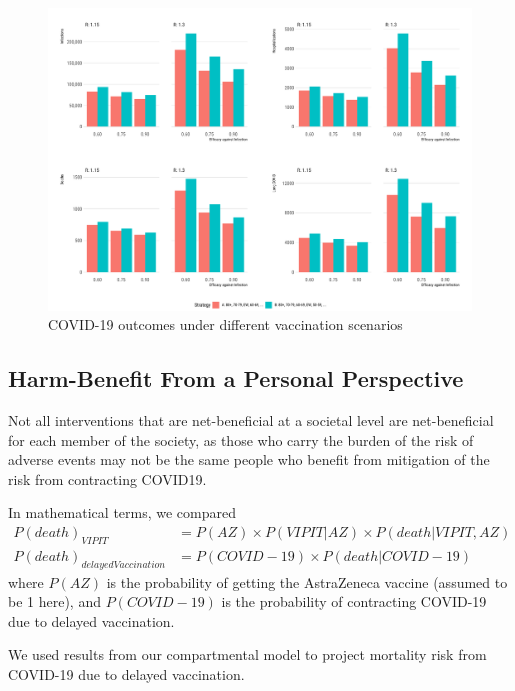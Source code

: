 \documentclass[]{interact}
\theoremstyle{plain}%
\theoremstyle{definition}
\theoremstyle{remark}
\begin{document}
\begin{figure}

{\centering \includegraphics[width=1\linewidth]{../figures/fig-barplots} 

}

\caption{COVID-19 outcomes under different vaccination scenarios}\label{fig:fig2}
\end{figure}

\hypertarget{harm-benefit-from-a-personal-perspective}{%
\subsection{Harm-Benefit From a Personal
Perspective}\label{harm-benefit-from-a-personal-perspective}}

Not all interventions that are net-beneficial at a societal level are
net-beneficial for each member of the society, as those who carry the
burden of the risk of adverse events may not be the same people who
benefit from mitigation of the risk from contracting COVID19.

In mathematical terms, we compared \[
\begin{aligned}
P(death)_{VIPIT}  &= P(AZ) \times P(VIPIT|AZ) \times P(death|VIPIT, AZ) \\
P(death)_{delayedVaccination} &= P(COVID-19) \times P(death|COVID-19)
\end{aligned}
\] where \(P(AZ)\) is the probability of getting the AstraZeneca vaccine
(assumed to be 1 here), and \(P(COVID-19)\) is the probability of
contracting COVID-19 due to delayed vaccination.

We used results from our compartmental model to project mortality risk
from COVID-19 due to delayed vaccination.
\end{document}
